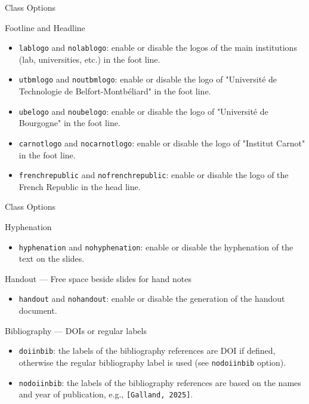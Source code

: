 \documentclass[english,sectioncirclenumberstyle]{ciadbeamer}
\begin{document}
\begin{frame}[t]{Class Options \insertcontinuationtext}
	\begin{block}{Footline and Headline}
		\begin{itemize}
		\item \texttt{lablogo} and \texttt{nolablogo}: enable or disable the logos of the main institutions (lab, universities, etc.) in the foot line.
		\item \texttt{utbmlogo} and \texttt{noutbmlogo}: enable or disable the logo of "Universit\'e de Technologie de Belfort-Montb\'eliard" in the foot line.
		\item \texttt{ubelogo} and \texttt{noubelogo}: enable or disable the logo of "Universit\'e de Bourgogne" in the foot line.
		\item \texttt{carnotlogo} and \texttt{nocarnotlogo}: enable or disable the logo of "Institut Carnot" in the foot line.
		\item \texttt{frenchrepublic} and \texttt{nofrenchrepublic}: enable or disable the logo of the French Republic in the head line.
		\end{itemize}
	\end{block}
\end{frame}

\begin{frame}[t]{Class Options \insertcontinuationtext}
	\begin{block}{Hyphenation}
		\begin{itemize}
		\item \texttt{hyphenation} and \texttt{nohyphenation}: enable or disable the hyphenation of the text on the slides.
		\end{itemize}
	\end{block}
	\begin{block}{Handout --- Free space beside slides for hand notes}
		\begin{itemize}
		\item \texttt{handout} and \texttt{nohandout}: enable or disable the generation of the handout document.
		\end{itemize}
	\end{block}
	\begin{block}{Bibliography --- DOIs or regular labels}
		\begin{itemize}
		\item \texttt{doiinbib}: the labels of the bibliography references are DOI if defined, otherwise the regular bibliography label is used (see \texttt{nodoiinbib} option).
		\item \texttt{nodoiinbib}: the labels of the bibliography references are based on the names and year of publication, e.g., \texttt{[Galland, 2025]}.
		\end{itemize}
	\end{block}
\end{frame}
\end{document}
